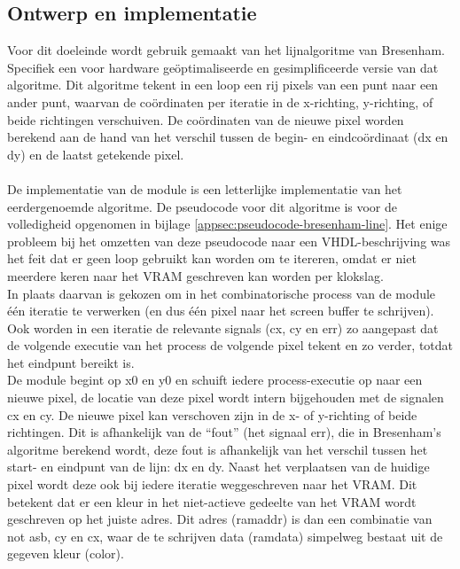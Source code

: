 \documentclass{scrartcl} %
\begin{document}
\subsection{Ontwerp en implementatie}
Voor dit doeleinde wordt gebruik gemaakt van het lijnalgoritme van Bresenham. Specifiek een voor hardware geöptimaliseerde en gesimplificeerde versie van dat algoritme. \cite{line-alg} Dit algoritme tekent in een loop een rij pixels van een punt naar een ander punt, waarvan de coördinaten per iteratie in de x-richting, y-richting, of beide richtingen verschuiven. De coördinaten van de nieuwe pixel worden berekend aan de hand van het verschil tussen de begin- en eindcoördinaat (dx en dy) en de laatst getekende pixel.
\\\\
De implementatie van de module is een letterlijke implementatie van het eerdergenoemde algoritme. De pseudocode voor dit algoritme is voor de volledigheid opgenomen in bijlage \ref{appsec:pseudocode-bresenham-line}. Het enige probleem bij het omzetten van deze pseudocode naar een VHDL-beschrijving was het feit dat er geen loop gebruikt kan worden om te itereren, omdat er niet meerdere keren naar het VRAM geschreven kan worden per klokslag.
\\
In plaats daarvan is gekozen om in het combinatorische process van de module één iteratie te verwerken (en dus één pixel naar het screen buffer te schrijven). Ook worden in een iteratie de relevante signals (cx, cy en err) zo aangepast dat de volgende executie van het process de volgende pixel tekent en zo verder, totdat het eindpunt bereikt is.
\\
De module begint op x0 en y0 en schuift iedere process-executie op naar een nieuwe pixel, de locatie van deze pixel wordt intern bijgehouden met de signalen cx en cy. De nieuwe pixel kan verschoven zijn in de x- of y-richting of beide richtingen. Dit is afhankelijk van de ``fout'' (het signaal err), die in Bresenham's algoritme berekend wordt, deze fout is afhankelijk van het verschil tussen het start- en eindpunt van de lijn: dx en dy. Naast het verplaatsen van de huidige pixel wordt deze ook bij iedere iteratie weggeschreven naar het VRAM. Dit betekent dat er een kleur in het niet-actieve gedeelte van het VRAM wordt geschreven op het juiste adres. Dit adres (ramaddr) is dan een combinatie van not asb, cy en cx, waar de te schrijven data (ramdata) simpelweg bestaat uit de gegeven kleur (color).

\end{document}
